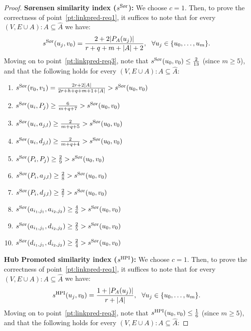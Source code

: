 \documentclass[twocolumn]{article}
\newcommand{\FA}{\widehat{A}}
\newcommand{\PA}{P_{A}}
\newcommand{\sSor}{s^{\text{\normalfont S{\o}r}}}
\newcommand{\sHPI}{s^{\text{\normalfont HPI}}}
\begin{document}
\begin{proof}
\noindent \textbf{S{\o}rensen similarity index ($\sSor$):} We choose $c=1$. Then, to prove the correctness of point~\ref{pt:linkpred-req1}, it suffices to note that for every $(V,E\cup A):A \subseteq \FA$ we have: $$
\sSor(u_j,v_0)=\frac{2+2|\PA(u_j)|}{r+q+m+|A|+2},\ \ \forall u_j\in\{u_0,\ldots, u_m\}.
$$
Moving on to point~\ref{pt:linkpred-req3}, note that $\sSor(u_0,v_0) \leq \frac{2}{13}$ (since $m \geq 5$), and that the following holds for every $(V,E\cup A):A \subseteq \FA$:

\begin{enumerate}[label=(\roman*),leftmargin=*]\itemsep0.5em
\item $\sSor(v_0,v_1)=\frac{2r + 2|A|}{2r+h+q+m+1+|A|} > \sSor(u_0,v_0)$
\item $\sSor(u_i,P_j) \geq \frac{6}{m+q+7} > \sSor(u_0,v_0)$
\item $\sSor(u_i,a_{j,l}) \geq \frac{2}{m+q+5} > \sSor(u_0,v_0)$
\item $\sSor(u_i,d_{j,l}) \geq \frac{2}{m+q+4} > \sSor(u_0,v_0)$
\item $\sSor(P_i,P_j) \geq \frac{2}{9} > \sSor(u_0,v_0)$
\item $\sSor(P_i,a_{j,l}) \geq \frac{2}{8} > \sSor(u_0,v_0)$
\item $\sSor(P_i,d_{j,l}) \geq \frac{2}{7} > \sSor(u_0,v_0)$
\item $\sSor(a_{i_1,j_1},a_{i_2,j_2}) \geq \frac{4}{6} > \sSor(u_0,v_0)$
\item $\sSor(a_{i_1,j_1},d_{i_2,j_2}) \geq \frac{2}{5} > \sSor(u_0,v_0)$
\item $\sSor(d_{i_1,j_1},d_{i_2,j_2}) \geq \frac{2}{4} > \sSor(u_0,v_0)$
\end{enumerate}

\noindent \textbf{Hub Promoted similarity index ($\sHPI$):} We choose $c=1$. Then, to prove the correctness of point~\ref{pt:linkpred-req1}, it suffices to note that for every $(V,E\cup A):A \subseteq \FA$ we have: $$
\sHPI(u_j,v_0)=\frac{1+|\PA(u_j)|}{r+|A|},\ \ \forall u_j\in\{u_0,\ldots, u_m\}.
$$
Moving on to point~\ref{pt:linkpred-req3}, note that $\sHPI(u_0,v_0) \leq \frac{1}{6}$ (since $m \geq 5$), and that the following holds for every $(V,E\cup A):A \subseteq \FA$:


\end{proof}
\end{document}
